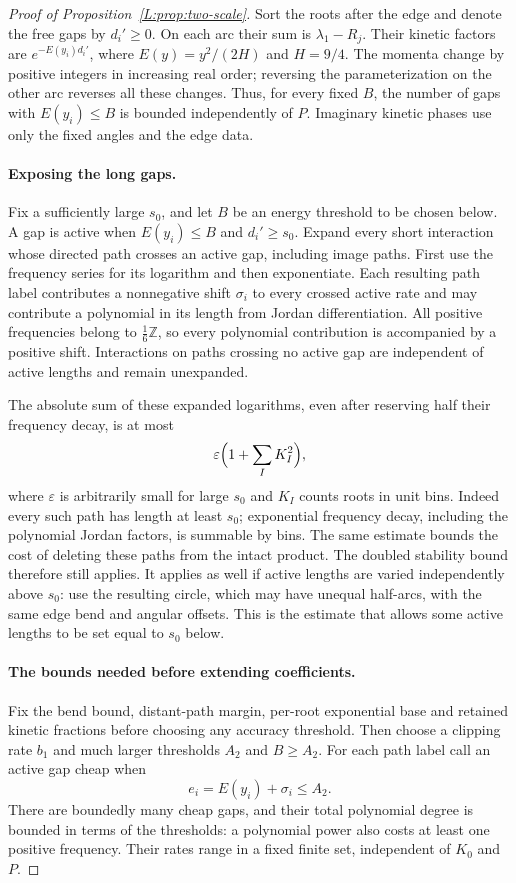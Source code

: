 \begin{proof}[Proof of Proposition~\ref{L:prop:two-scale}]
Sort the roots after the edge and denote the free gaps by $d_i'\ge0$.
On each arc their sum is $\lambda_1-R_j$. Their kinetic factors are
$e^{-E(y_i)d_i'}$, where $E(y)=y^2/(2H)$ and $H=9/4$. The momenta
change by positive integers in increasing real order; reversing the
parameterization on the other arc reverses all these changes. Thus,
for every fixed $B$, the number of gaps with $E(y_i)\le B$ is bounded
independently of $P$. Imaginary kinetic phases use only the fixed
angles and the edge data.

\paragraph{Exposing the long gaps.}
Fix a sufficiently large $s_0$, and let $B$ be an energy threshold to
be chosen below. A gap is active when
$E(y_i)\le B$ and $d_i'\ge s_0$. Expand every short interaction whose
directed path crosses an active gap, including image paths. First use
the frequency series for its logarithm and then exponentiate. Each
resulting path label contributes a nonnegative shift $\sigma_i$ to
 every crossed active rate and may contribute a polynomial in its
length from Jordan differentiation. All positive frequencies belong
to $\tfrac16\mathbb Z$, so every polynomial contribution is accompanied
by a positive shift. Interactions on paths crossing no active gap are
independent of active lengths and remain unexpanded.

The absolute sum of these expanded logarithms, even after reserving
half their frequency decay, is at most
\[
       \varepsilon\Bigl(1+\sum_I K_I^2\Bigr),
\]
where $\varepsilon$ is arbitrarily small for large $s_0$ and $K_I$
counts roots in unit bins. Indeed every such path has length at least
$s_0$; exponential frequency decay, including the polynomial Jordan
factors, is summable by bins. The same estimate bounds the cost of
deleting these paths from the intact product. The doubled stability
bound therefore still applies. It applies as well if active lengths
are varied independently above $s_0$: use the resulting circle, which
may have unequal half-arcs, with the same edge bend and angular
offsets. This is the estimate that allows some active lengths to be
set equal to $s_0$ below.

\paragraph{The bounds needed before extending coefficients.}
Fix the bend bound, distant-path margin, per-root exponential base and
retained kinetic fractions before choosing any accuracy threshold.
Then choose a clipping rate $b_1$ and much larger thresholds $A_2$ and
$B\ge A_2$. For each path label call an active gap cheap when
\[
                  e_i=E(y_i)+\sigma_i\le A_2.
\]
There are boundedly many cheap gaps, and their total polynomial degree
is bounded in terms of the thresholds: a polynomial power also costs
at least one positive frequency. Their rates range in a fixed finite
set, independent of $K_0$ and $P$.


\end{proof}
